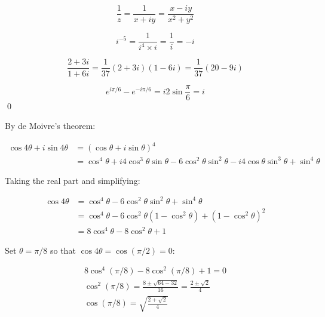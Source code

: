 \documentclass[12pt]{article}
\begin{document}
\begin{equation}
    \frac{1}{z} = \frac{1}{x + iy} = \frac{x - iy}{x^{2} + y^{2}}
\end{equation}


\begin{equation}
    i^{-5} = \frac{1}{i^{4} \times i} = \frac{1}{i} = -i
\end{equation}


\begin{equation}
    \frac{2 + 3i}{1 + 6i} = \frac{1}{37} (2 + 3i)(1 - 6i) = \frac{1}{37} (20 - 9i)
\end{equation}


\begin{equation}
    e^{i \pi/6} - e^{-i \pi/6} = i 2\sin{\frac{\pi}{6}} = i
\end{equation}
\qed


By de Moivre's theorem:

\begin{equation}
    \begin{split}
        \cos{4\theta} + i\sin{4\theta} &= (\cos{\theta} + i\sin{\theta})^{4} \\
        &= \cos^{4}{\theta} + i4\cos^{3}{\theta} \sin{\theta} - 6\cos^{2}{\theta} \sin^{2}{\theta} - i4\cos{\theta} \sin^{3}{\theta} + \sin^{4}{\theta}
    \end{split}
\end{equation}

Taking the real part and simplifying:

\begin{equation}
    \begin{split}
        \cos{4\theta} &= \cos^{4}{\theta} - 6\cos^{2}{\theta} \sin^{2}{\theta} + \sin^{4}{\theta} \\
        &= \cos^{4}{\theta} - 6\cos^{2}{\theta} (1 - \cos^{2}{\theta}) + (1 - \cos^{2}{\theta})^{2} \\
        &= 8\cos^{4}{\theta} - 8\cos^{2}{\theta} + 1
    \end{split}
\end{equation}

Set $\theta = \pi/8$ so that $\cos{4\theta} = \cos{(\pi/2)} = 0$:

\begin{equation}
    \begin{split}
        8\cos^{4}{(\pi/8)} - 8\cos^{2}{(\pi/8)} + 1 = 0 \\
        \cos^{2}{(\pi/8)} = \frac{8 \pm \sqrt{64 - 32}}{16} = \frac{2 \pm \sqrt{2}}{4} \\
        \cos{(\pi/8)} = \sqrt{\frac{2 + \sqrt{2}}{4}}
    \end{split}
\end{equation}
\end{document}

